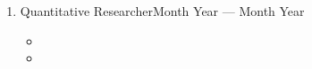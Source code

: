 \begin{enumerate}[rightmargin=0.5cm]
 \item[]
 {{Quantitative Researcher}}{Month Year --- Month Year}
 \begin{itemize}
  \item[\bcdot]{\blindtext}
  \item[\bcdot]{\blindtext}
  \end{itemize}
\end{enumerate}